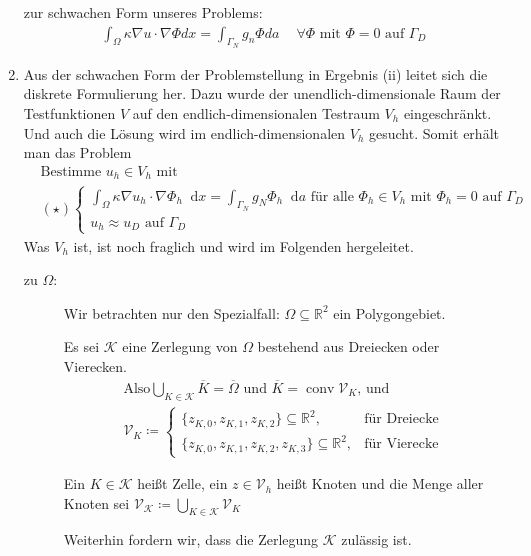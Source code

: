 \documentclass[12pt,a4paper]{scrartcl}
\newcommand{\R}{\mathbb{R}}
\newcommand*\diff{\mathop{}\!\mathrm{d}}
\DeclareMathOperator{\conv}{conv}
\newcommand{\defi}[1]{\textcolor{Mygreen}{#1}}
\numberwithin{equation}{section}
\begin{document}
\begin{enumerate}[label=(\roman*)]
zur schwachen Form unseres Problems:
\begin{align*}
\int_{\Omega}{ \kappa \nabla u \cdot \nabla \Phi dx} = \int_{ \Gamma_N }{g_n \Phi da} \text{  } \; \; \forall \Phi \text{ mit } \Phi = 0 \text{ auf } \Gamma_D
\end{align*}

\item
Aus der schwachen Form der Problemstellung in Ergebnis (ii) leitet sich die diskrete Formulierung her. Dazu wurde der unendlich-dimensionale Raum der Testfunktionen $V$ auf den endlich-dimensionalen Testraum $V_h$ eingeschränkt. Und auch die Lösung wird im endlich-dimensionalen $V_h$ gesucht. Somit erhält man das Problem
\begin{align*}
&\text{Bestimme } u_h \in V_h \text{ mit }\\
&(\star)\begin{cases}
	\int_{\Omega} \kappa \nabla u_h \cdot \nabla \Phi_h \diff x = \int_{\Gamma_N} g_N  \Phi_h \diff a \text{ für alle } \Phi_h \in V_h \text{ mit } \Phi_h = 0 \text{ auf } \Gamma_D \\
	u_h \approx u_D \text{ auf } \Gamma_D
\end{cases}
\end{align*}
Was $ V_h $ ist, ist noch fraglich und wird im Folgenden hergeleitet.
\begin{description}
	\item [zu $\Omega$:]
	Wir betrachten nur den Spezialfall: $\Omega \subseteq \R^2$ ein Polygongebiet. 
	
	Es sei $\mathcal{K}$ eine Zerlegung von $\Omega$ bestehend aus Dreiecken oder Vierecken.
	\begin{align*}
	\text{Also} \bigcup_{K \in \mathcal{K}} \overline{K} = \overline{\Omega} \text{ und } \overline{K} = \conv \mathcal{V}_K \text{, und}\\
	\mathcal{V}_K \coloneqq
	 \begin{cases}
	\{z_{K,0}, z_{K,1}, z_{K,2}\} \subseteq \R^2, &\text{für Dreiecke} \\
	\{z_{K,0}, z_{K,1}, z_{K,2}, z_{K,3}\} \subseteq \R^2, &\text{für Vierecke}
	\end{cases}
	\end{align*}
	
	Ein $ K \in \mathcal{K} $ heißt \defi{Zelle}, ein $ z \in \mathcal{V}_h $ heißt \defi{Knoten} und die Menge aller Knoten sei $\mathcal{V}_\mathcal{K} \coloneqq \bigcup_{K \in \mathcal{K}} \mathcal{V}_K$
	
	Weiterhin fordern wir, dass die Zerlegung $\mathcal{K}$ zulässig ist.
	

\end{description}
\end{enumerate}
\end{document}
